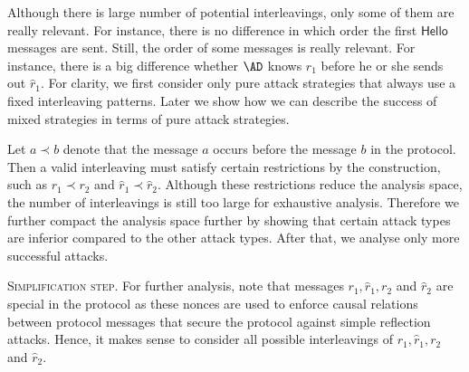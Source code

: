 \documentclass{crypto-exercise}
\begin{document}
\begin{solution} 
Although there is large number of potential interleavings, only some of them are
really relevant. For instance, there is no difference in which order the first
$\mathsf{Hello}$ messages are sent. Still, the order of some messages is really
relevant. For instance, there is a big difference whether $\AD$ knows $r_1$
before he or she sends out $\hat{r}_1$. For clarity, we first consider only pure
attack strategies that always use a fixed interleaving patterns. Later we show
how we can describe the success of mixed strategies in terms of pure attack
strategies. 

Let $a\prec b$ denote that the message $a$ occurs before the message $b$ in the
protocol. Then a valid interleaving must satisfy certain restrictions by the
construction, such as $r_1\prec r_2$ and $\hat{r}_1\prec \hat{r}_2$. Although
these restrictions reduce the analysis space, the number of interleavings is
still too large for exhaustive analysis. Therefore we further compact the
analysis space further by showing that certain attack types are inferior
compared to the other attack types. After that, we analyse only more successful
attacks. 

\vspace*{2ex}
\noindent
\textsc{Simplification step.} For further analysis, note that messages
$r_1,\hat{r}_1,r_2$ and $\hat{r}_2$ are special in the protocol as these nonces
are used to enforce causal relations between protocol messages that secure the
protocol against simple reflection attacks. Hence, it makes sense to consider
all possible interleavings of $r_1,\hat{r}_1,r_2$ and $\hat{r}_2$.     


\end{solution}
\end{document}
